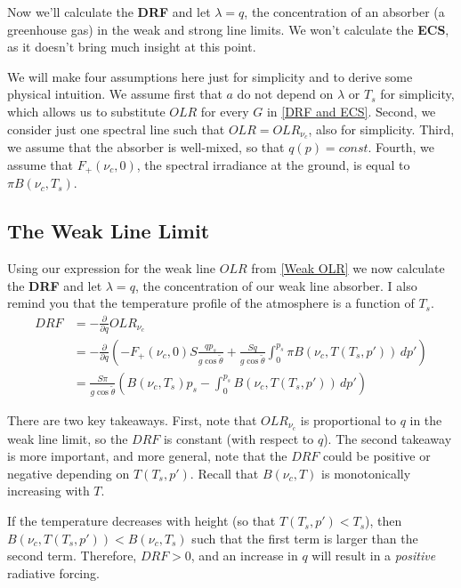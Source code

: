 Now we'll calculate the \textbf{DRF} and let $\lambda=q$, the concentration of an absorber (a greenhouse gas) in the weak and strong line limits. We won't calculate the \textbf{ECS}, as it doesn't bring much insight at this point.

We will make four assumptions here just for simplicity and to derive some physical intuition. We assume first that $a$ do not depend on $\lambda$ or $T_s$ for simplicity, which allows us to substitute $OLR$ for every $G$ in \ref{DRF and ECS}. Second, we consider just one spectral line such that $OLR=OLR_{\nu_c}$, also for simplicity. Third, we assume that the absorber is well-mixed, so that $q(p)=const$. Fourth, we assume that $F_+(\nu_c,0)$, the spectral irradiance at the ground, is equal to $\pi B(\nu_c,T_s)$.

\subsection{The Weak Line Limit}

Using our expression for the weak line $OLR$ from \ref{Weak OLR} we now calculate the \textbf{DRF} and let $\lambda=q$, the concentration of our weak line absorber. I also remind you that the temperature profile of the atmosphere is a function of $T_s$.
\begin{align}
    DRF &= -\frac{\partial}{\partial q}OLR_{\nu_c}\nonumber\\
    &=-\frac{\partial}{\partial q} \left( 
        -F_+(\nu_c,0)S\frac{qp_s}{g\cos\tilde{\theta}}+\frac{Sq}{g\cos\tilde{\theta}}\int_{0}^{p_s}\pi B(\nu_c,T(T_s,p'))\,dp'
     \right)\nonumber\\
    \label{DRF Weak Explicit}
    &=
    \frac{S\pi}{g\cos\tilde{\theta}}\left( 
        B(\nu_c,T_s)p_s - \int_{0}^{p_s} B(\nu_c,T(T_s,p'))\,dp'
     \right)
\end{align}

There are two key takeaways. First, note that $OLR_{\nu_c}$ is proportional to $q$ in the weak line limit, so the $DRF$ is constant (with respect to $q$). The second takeaway is more important, and more general, note that the $DRF$ could be positive or negative depending on $T(T_s,p')$. Recall that $B(\nu_c,T)$ is monotonically increasing with $T$. 

If the temperature decreases with height (so that $T(T_s,p')<T_s$), then $B(\nu_c,T(T_s,p'))<B(\nu_c,T_s)$ such that the first term is larger than the second term. Therefore, $DRF>0$, and an increase in $q$ will result in a \textit{positive} radiative forcing.

